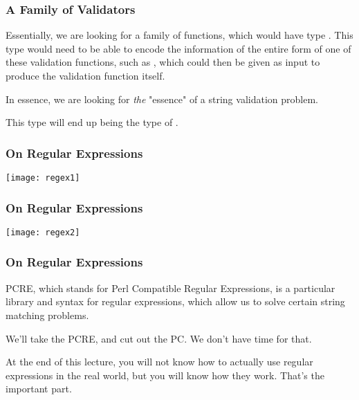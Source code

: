 \documentclass[aspectratio=169]{beamer}
\begin{document}
\begin{frame}[fragile]
  \frametitle{A Family of Validators}

  Essentially, we are looking for a family of functions, which would have
  type . This type  would need to be able
  to encode the information of the entire form of one of these validation functions,
  such as , which could then be given as input to produce the
  validation function itself.

  \pause
  \vspace{\fill}

  In essence, we are looking for \textit{the} "essence" of a string validation problem.

  \pause
  \vspace{\fill}

  This type  will end up being the type of .
\end{frame}


\begin{frame}[fragile]
  \frametitle{On Regular Expressions}

  \begin{center}
    \texttt{[image: regex1]}
  \end{center}
\end{frame}

\begin{frame}[fragile]
  \frametitle{On Regular Expressions}

  \begin{center}
    \texttt{[image: regex2]}\footnotemark
  \end{center}

\end{frame}

\begin{frame}[fragile]
  \frametitle{On Regular Expressions}

  PCRE, which stands for Perl Compatible Regular Expressions, is a particular
  library and syntax for regular expressions, which allow us to solve certain
  string matching problems.

  \pause
  \vspace{\fill}

  We'll take the PCRE, and cut out the PC. We don't have time for that.

  \pause
  \vspace{\fill}

  At the end of this lecture, you will not know how to actually use regular
  expressions in the real world, but you will know how they work.
  That's the important part.
\end{frame}
\end{document}
